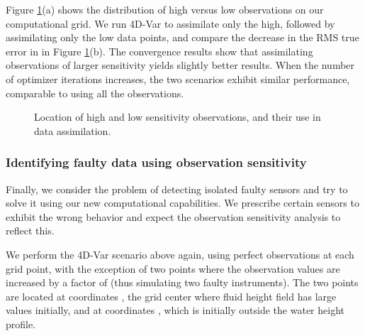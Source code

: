 \documentclass[final,sort&compress]{elsarticle}
\begin{document}
Figure \ref{fig:OI_mask}(a) shows the distribution of {\sc high} versus {\sc low} observations on our computational grid. 
We run 4D-Var to assimilate only the {\sc high}, followed by assimilating only the {\sc low} data points, 
and compare the decrease in the RMS true error in  in Figure \ref{fig:OI_mask}(b). 
The convergence results show that assimilating observations of larger sensitivity yields slightly better results.
When the number of optimizer iterations increases, the two scenarios exhibit
similar performance, comparable to using all the observations.

\begin{figure}
\begin{center}
\setcounter{subfigure}{0}
\caption{Location of high and low sensitivity observations, and their use in data assimilation.}
\label{fig:OI_mask}
\end{center}
\end{figure}






\subsubsection{Identifying faulty data using observation sensitivity}

Finally, we consider the problem of detecting isolated faulty sensors and try to solve it using our new computational capabilities.
We prescribe certain sensors to exhibit the wrong behavior and expect the observation sensitivity analysis to reflect this.

We perform the 4D-Var scenario above again, using perfect observations at each grid point, with the exception of two points where
the observation values are increased by a factor of  (thus simulating two faulty instruments). The two points are located at coordinates , 
the grid center where fluid height field has large values initially, and at coordinates , which is initially outside the water height profile.
\end{document}
